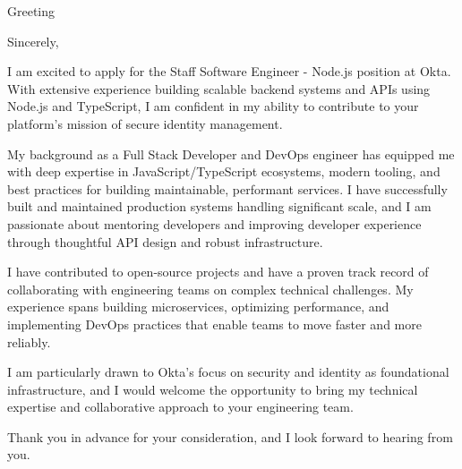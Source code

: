 \documentclass[11pt,a4paper,sans]{moderncv}
\begin{document}
\date{17-05-2026}
\opening{Greeting}
\closing{Sincerely,}
\makelettertitle

I am excited to apply for the Staff Software Engineer - Node.js position at Okta. With extensive experience building scalable backend systems and APIs using Node.js and TypeScript, I am confident in my ability to contribute to your platform's mission of secure identity management.

My background as a Full Stack Developer and DevOps engineer has equipped me with deep expertise in JavaScript/TypeScript ecosystems, modern tooling, and best practices for building maintainable, performant services. I have successfully built and maintained production systems handling significant scale, and I am passionate about mentoring developers and improving developer experience through thoughtful API design and robust infrastructure.

I have contributed to open-source projects and have a proven track record of collaborating with engineering teams on complex technical challenges. My experience spans building microservices, optimizing performance, and implementing DevOps practices that enable teams to move faster and more reliably.

I am particularly drawn to Okta's focus on security and identity as foundational infrastructure, and I would welcome the opportunity to bring my technical expertise and collaborative approach to your engineering team.

Thank you in advance for your consideration, and I look forward to hearing from you.

\makeletterclosing
\end{document}
